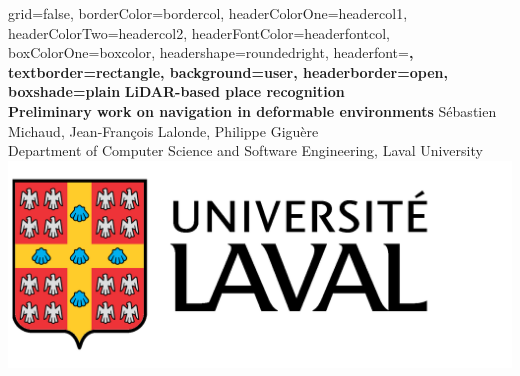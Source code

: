 \documentclass[a0paper,portrait]{baposter}
\begin{document}
\begin{poster}{
grid=false,
borderColor=bordercol, %
headerColorOne=headercol1, %
headerColorTwo=headercol2, %
headerFontColor=headerfontcol, %
boxColorOne=boxcolor, %
headershape=roundedright, %
headerfont=\Large\sf\bf, %
textborder=rectangle,
background=user,
headerborder=open, %
boxshade=plain
}
{}
%
%
{\sf\bf LiDAR-based place recognition 
\\ \large Preliminary work on navigation in deformable environments} %
{\vspace{1em} Sébastien Michaud, Jean-François Lalonde, Philippe Giguère\\ %
{\smaller Department of Computer Science and Software Engineering, Laval University}} %
{\includegraphics[scale=0.12]{./figures/logo.png}} %

\end{poster}
\end{document}
